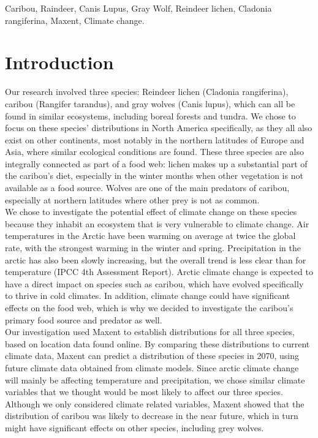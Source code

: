 \documentclass[twoside]{article}
\begin{document}
\begin{framed}
\begin{abstract}
\end{abstract}

\begin{keywords}

Caribou,
Raindeer,
Canis Lupus,
Gray Wolf,
Reindeer lichen,
Cladonia rangiferina,
Maxent,
Climate change.

\end{keywords}

\end{framed}

\section{Introduction}
Our research involved three species: Reindeer lichen (Cladonia rangiferina),
caribou (Rangifer tarandus), and gray wolves (Canis lupus), which can all be
found in similar ecosystems, including boreal forests and tundra. We chose to
focus on these species’ distributions in North America specifically, as they
all also exist on other continents, most notably in the northern latitudes of
Europe and Asia, where similar ecological conditions are found. These three
species are also integrally connected as part of a food web: lichen makes up
a substantial part of the caribou’s diet, especially in the winter months when
other vegetation is not available as a food source. Wolves are one of the main
predators of caribou, especially at northern latitudes where other prey is not
as common. \\
We chose to investigate the potential effect of climate change on these species
because they inhabit an ecosystem that is very vulnerable to climate change.
Air temperatures in the Arctic have been warming on average at twice the global
rate, with the strongest warming in the winter and spring. Precipitation in the
arctic has also been slowly increasing, but the overall trend is less clear
than for temperature (IPCC 4th Assessment Report). Arctic climate change is
expected to have a direct impact on species such as caribou, which have evolved
specifically to thrive in cold climates. In addition, climate change could have
significant effects on the food web, which is why we decided to investigate the
caribou’s primary food source and predator as well. \\
Our investigation used Maxent to establish distributions for all three species,
based on location data found online. By comparing these distributions to current
climate data, Maxent can predict a distribution of these species in 2070, using
future climate data obtained from climate models. Since arctic climate change
will mainly be affecting temperature and precipitation, we chose similar climate
variables that we thought would be most likely to affect our three species.
Although we only considered climate related variables, Maxent showed that the
distribution of caribou was likely to decrease in the near future, which in turn
might have significant effects on other species, including grey wolves.
\end{document}
